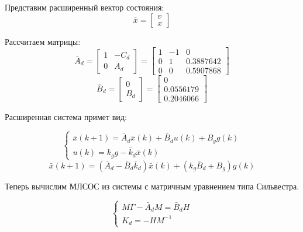\documentclass[a4paper,14pt]{extreport}
\begin{document}
Представим расширенный вектор состояния:
\begin{equation}
	\bar x = 
	\begin{bmatrix}
	v\\
	x
	\end{bmatrix}
\end{equation}

Рассчитаем матрицы:
\begin{equation}
	\bar A_d =
	\begin{bmatrix}
	1 & -C_d\\
	0 & A_d
	\end{bmatrix}
=
\begin{bmatrix}
    1& - 1&    0\\        
0&   1&   0.3887642  \\
0&   0&    0.5907868 
\end{bmatrix}
\end{equation}
\begin{equation}
\bar B_d =
\begin{bmatrix}
0\\
B_d
\end{bmatrix}
=
\begin{bmatrix}
0\\
    0.0556179  \\
0.2046066 
\end{bmatrix}
\end{equation}

Расширенная система примет вид:

\begin{equation}
	\begin{cases}
	\bar x(k+1) = \bar A_d \bar x(k) + \bar B_d u(k) + B_g g(k) \\
	u(k) = k_g g - \bar k_d \bar x(k)
	\end{cases}
\end{equation}
\begin{equation}
	\bar x(k+1) = (\bar A_d - \bar B_d \bar k_d) \bar x (k) +  (k_g \bar B_d + B_g) g(k)
\end{equation}

Теперь вычислим МЛСОС из системы с матричным уравнением типа Сильвестра.

\begin{equation}
	\begin{cases}
	M \Gamma - \bar A_d M = \bar B_d H\\
	K_d = - H M^{-1}
	\end{cases}
\end{equation}
\end{document}
